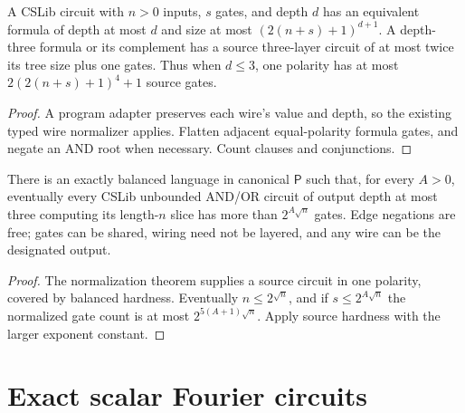 \begin{theorem}
  \label{thm:circuits-openai-cslib-normalize}
  \leanok
  A CSLib circuit with $n>0$ inputs, $s$ gates, and depth $d$ has an equivalent
  formula of depth at most $d$ and size at most $(2(n+s)+1)^{d+1}$.
  A depth-three formula or its complement has a source three-layer circuit
  of at most twice its tree size plus one gates. Thus when $d\le3$, one
  polarity has at most $2(2(n+s)+1)^4+1$ source gates.
\end{theorem}
\begin{proof}
  \leanok
  A program adapter preserves each wire's value and depth, so the existing
  typed wire normalizer applies. Flatten adjacent equal-polarity formula
  gates, and negate an AND root when necessary. Count clauses and conjunctions.
\end{proof}

\begin{theorem}
  \label{thm:circuits-openai-cslib-lower-bound}
  \leanok
  There is an exactly balanced language in canonical $\mathsf P$ such that,
  for every $A>0$, eventually every CSLib unbounded AND/OR circuit of output
  depth at most three computing its length-$n$ slice has more than
  $2^{A\sqrt n}$ gates. Edge negations are free; gates can be shared, wiring
  need not be layered, and any wire can be the designated output.
\end{theorem}
\begin{proof}
  \leanok
  The normalization theorem supplies a source circuit in one polarity,
  covered by balanced hardness. Eventually $n\le2^{\sqrt n}$, and if
  $s\le2^{A\sqrt n}$ the normalized gate count is at most
  $2^{5(A+1)\sqrt n}$. Apply source hardness with the larger exponent constant.
\end{proof}

\section{Exact scalar Fourier circuits}

